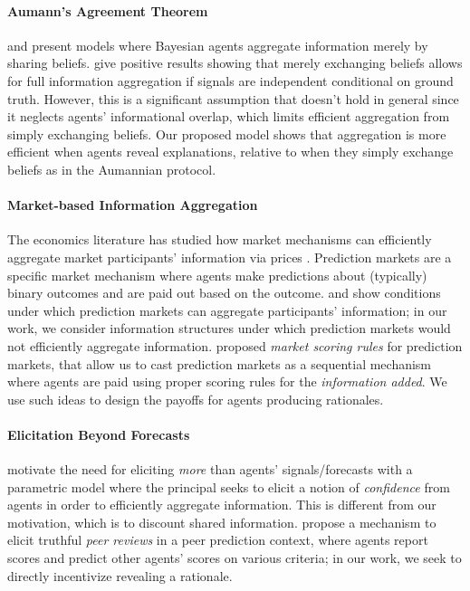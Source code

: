 \documentclass{winnower}
\begin{document}
\paragraph{Aumann's Agreement Theorem} \citet{aumann1976agreeing} and \citet{geanakoplos1982we} present models where Bayesian agents aggregate information merely by sharing beliefs. \citet{kong2022false} give positive results showing that merely exchanging beliefs allows for full information aggregation if signals are independent conditional on ground truth. However, this is a significant assumption that doesn't hold in general since it neglects agents' informational overlap, which limits efficient aggregation from simply exchanging beliefs. Our proposed model shows that aggregation is more efficient when agents reveal explanations, relative to when they simply exchange beliefs as in the Aumannian protocol.

\paragraph{Market-based Information Aggregation} The economics literature has studied how market mechanisms can efficiently aggregate market participants' information via prices \citep{fama1970efficient}. Prediction markets \citep{wolfers2004prediction, chen2010gaming} are a specific market mechanism where agents make predictions about (typically) binary outcomes and are paid out based on the outcome. \citet{ostrovsky2009information} and \citet{kong2022false} show conditions under which prediction markets can aggregate participants' information; in our work, we consider information structures under which prediction markets would not efficiently aggregate information.  \citet{hanson2003combinatorial} proposed \emph{market scoring rules} for prediction markets, that allow us to cast prediction markets as a sequential mechanism where agents are paid using proper scoring rules for the \emph{information added}. We use such ideas to design the payoffs for agents producing rationales.


\paragraph{Elicitation Beyond Forecasts} \citet{frongillo2015elicitation} motivate the need for eliciting \emph{more} than agents' signals/forecasts with a parametric model where the principal seeks to elicit a notion of \emph{confidence} from agents in order to efficiently aggregate information. This is different from our motivation, which is to discount shared information.  \citet{srinivasan2021auctions} propose a mechanism to elicit truthful \emph{peer reviews} in a peer prediction context, where agents report scores and predict other agents' scores on various criteria; in our work, we seek to directly incentivize revealing a rationale.
\end{document}

